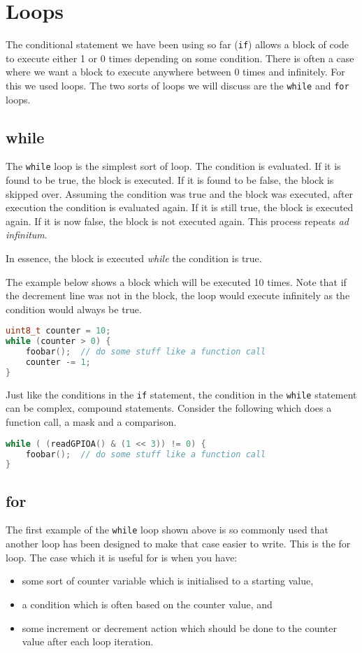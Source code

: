\chapter{Loops}
The conditional statement we have been using so far (\texttt{if}) allows a block of code to execute either 1 or 0 times depending on some condition.
There is often a case where we want a block to execute anywhere between 0 times and infinitely. For this we used loops. 
The two sorts of loops we will discuss are the \texttt{while} and \texttt{for} loops.

\section{while}
The \texttt{while} loop is the simplest sort of loop. 
The condition is evaluated. If it is found to be true, the block is executed. If it is found to be false, the block is skipped over.
Assuming the condition was true and the block was executed, after execution the condition is evaluated again. 
If it is still true, the block is executed again. If it is now false, the block is not executed again. This process repeats \emph{ad infinitum}. 

In essence, the block is executed \emph{while} the condition is true.

The example below shows a block which will be executed 10 times. Note that if the decrement line was not in the block, the loop would execute infinitely as the condition would always be true.

\begin{lstlisting}[language=c]
uint8_t counter = 10;
while (counter > 0) {
    foobar();  // do some stuff like a function call
    counter -= 1; 
}
\end{lstlisting}

Just like the conditions in the \texttt{if} statement, the condition in the \texttt{while} statement can be complex, compound statements. 
Consider the following which does a function call, a mask and a comparison.

\begin{lstlisting}[language=c]
while ( (readGPIOA() & (1 << 3)) != 0) {
    foobar();  // do some stuff like a function call
}
\end{lstlisting}

\section{for}
The first example of the \texttt{while} loop shown above is so commonly used that another loop has been designed to make that case easier to write. 
This is the {for} loop.
The case which it is useful for is when you have: 
\begin{itemize}
    \item some sort of counter variable which is initialised to a starting value,
    \item a condition which is often based on the counter value, and
    \item some increment or decrement action which should be done to the counter value after each loop iteration.
\end{itemize}

